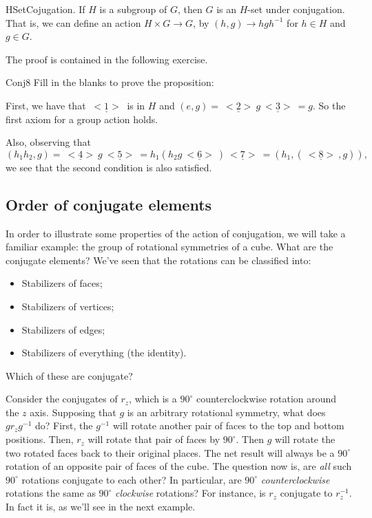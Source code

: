 \begin{prop}{HSetCojugation}. If $H$ is a subgroup of $G$, then $G$ is an $H$-set under conjugation.  That is, we can define an action $H \times G\rightarrow G$, by $(h, g) \rightarrow hgh^{-1}$ for $h\in H$ and $g\in G$. 
\end{prop}
The proof is contained in the following exercise.

\begin{exercise}{Conj8}
Fill in the blanks to prove the proposition:

\noindent
First, we have that $\underline{~<1>~}$ is in  $H$ and $(e, g) = \underline{~<2>~}g\underline{~<3>~} = g$.
So the first axiom for a group action holds. 

Also, observing that
\[(h_1h_2,g) = \underline{~<4>~}g\underline{~<5>~}
= h_1(h_2g\underline{~<6>~} )\underline{~<7>~}
= (h_1, (\underline{~<8>~}, g)),\]
we see that the second condition is also satisfied.
\end{exercise}


%

\subsection{Order of conjugate elements}

In order to illustrate some properties of the action of conjugation, we will take a familiar example: the group of rotational symmetries of a cube.
What are the conjugate elements?
We've seen that the rotations can be classified into:
\begin{itemize}
\item
Stabilizers of faces;
\item
Stabilizers of vertices;
\item
Stabilizers of edges;
\item
Stabilizers of everything (the identity).
\end{itemize}
Which of these are conjugate? 


Consider the conjugates of $r_z$, which is a  $90^{\circ}$ counterclockwise rotation around the $z$ axis. Supposing that $g$ is an arbitrary rotational symmetry, what does $g r_z g^{-1}$ do? First, the $g^{-1}$ will rotate another pair of faces to the top and bottom positions. Then, $r_z$ will rotate that pair of faces by  $90^{\circ}$. Then $g$ will rotate the two rotated faces back to their original places. The net result will always be a  $90^{\circ}$ rotation of an opposite pair of faces of the cube. 
The question now is, are \emph{all} such  $90^{\circ}$ rotations conjugate to each other? In particular, are  $90^{\circ}$ \emph{counterclockwise} rotations the same as  $90^{\circ}$ \emph{clockwise} rotations? For instance, is $r_z$ conjugate to $r_z^{-1}$.  In fact it is, as we'll see in the next example.

